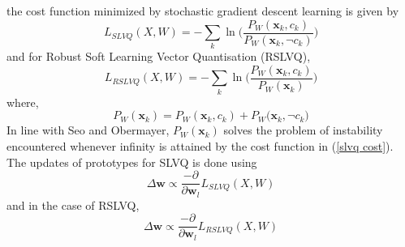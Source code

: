 \documentclass[english]{HSMW-Thesis}
\begin{document}
the cost function minimized by stochastic gradient descent learning is given by
\begin{equation}\label{slvq cost}
	L_{SLVQ}(X,W) = -\sum_{k}\ln\bigg(\frac{P_{W}(\mathbf{x}_{k},c_{k})}{P_{W}(\mathbf{x}_{k},\neg c_{k})}\bigg)
\end{equation}
and for Robust Soft Learning Vector Quantisation (RSLVQ),
\begin{equation}\label{RSLVQ}
	L_{RSLVQ}(X,W) = -\sum_{k}\ln\bigg(\frac{P_{W}(\mathbf{x}_{k},c_{k})}{P_{W}(\mathbf{x}_{k})}\bigg)
\end{equation}
where,
\begin{equation}
	P_{W}(\mathbf{x}_{k}) = P_{W}(\mathbf{x}_{k},c_{k}) + P_{W}(\mathbf{x}_{k},\neg c_{k}\big)
\end{equation}
In line with Seo and Obermayer\cite{seo2003soft},\hspace{2pt} $P_{W}(\mathbf{x}_{k})$\hspace{2pt} solves the problem of instability encountered whenever infinity  is attained by the cost function in (\ref{slvq cost}).
The updates of prototypes for SLVQ is done using
\begin{equation*}
	\Delta \mathbf{w}\propto \frac{-\partial}{\partial \mathbf{w}_{l}}L_{SLVQ}(X,W) 
\end{equation*}
and in the case of RSLVQ,
\begin{equation*}
	\Delta \mathbf{w}\propto \frac{-\partial}{\partial \mathbf{w}_{l}}L_{RSLVQ}(X,W) 
\end{equation*}


\end{document}
